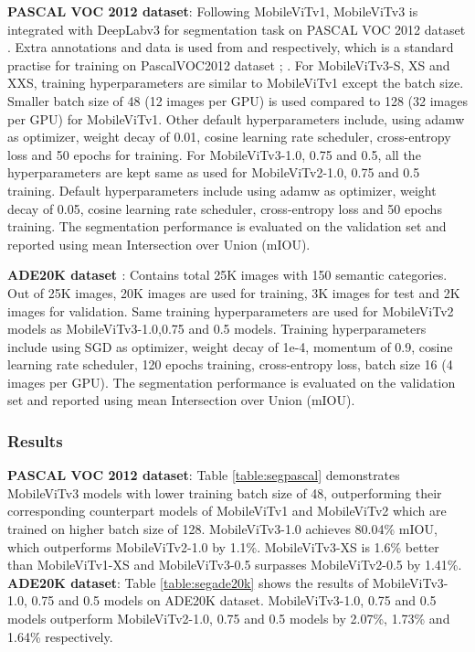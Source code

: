 \documentclass{article} \usepackage{iclr2022_conference,times}
\begin{document}
\textbf{PASCAL VOC 2012 dataset}: 
Following MobileViTv1, MobileViTv3 is integrated with DeepLabv3 \citep{chen2017rethinking} for segmentation task on PASCAL VOC 2012 dataset \citep{Everingham15}.
Extra annotations and data is used from \citep{hariharan2011semantic} and \citep{lin2014microsoft} respectively, which is a standard practise for training on PascalVOC2012 dataset \citep{chen2017rethinking}; \citep{mehta2019espnetv2}.
For MobileViTv3-S, XS and XXS, training hyperparameters are similar to MobileViTv1 except the batch size. 
Smaller batch size of 48 (12 images per GPU) is used compared to 128 (32 images per GPU) for MobileViTv1. 
Other default hyperparameters include, using adamw as optimizer, weight decay of 0.01, cosine learning rate scheduler, cross-entropy loss and 50 epochs for training. 
For MobileViTv3-1.0, 0.75 and 0.5, all the hyperparameters are kept same as used for MobileViTv2-1.0, 0.75 and 0.5 training. 
Default hyperparameters include using adamw as optimizer, weight decay of 0.05, cosine learning rate scheduler, cross-entropy loss and 50 epochs training. 
The segmentation performance is evaluated on the validation set and reported using mean Intersection over Union (mIOU).

\textbf{ADE20K dataset \citep{zhou2019semantic}}: 
Contains total 25K images with 150 semantic categories. 
Out of 25K images, 20K images are used for training, 3K images for test and 2K images for validation. 
Same training hyperparameters are used for MobileViTv2 models as MobileViTv3-1.0,0.75 and 0.5 models. 
Training hyperparameters include using SGD as optimizer, weight decay of 1e-4, momentum of 0.9, cosine learning rate scheduler, 120 epochs training, cross-entropy loss, batch size 16 (4 images per GPU). 
The segmentation performance is evaluated on the validation set and reported using mean Intersection over Union (mIOU).

\subsubsection{Results}

\textbf{PASCAL VOC 2012 dataset}: 
Table \ref{table:segpascal} demonstrates MobileViTv3 models with lower training batch size of 48, outperforming their corresponding counterpart models of MobileViTv1 and MobileViTv2 which are trained on higher batch size of 128.
MobileViTv3-1.0 achieves 80.04\% mIOU, which outperforms MobileViTv2-1.0 by 1.1\%.
MobileViTv3-XS is  1.6\% better than MobileViTv1-XS and MobileViTv3-0.5 surpasses MobileViTv2-0.5 by 1.41\%. 
\textbf{ADE20K dataset}: Table \ref{table:segade20k} shows the results of MobileViTv3-1.0, 0.75 and 0.5 models on ADE20K dataset. 
MobileViTv3-1.0, 0.75 and 0.5 models outperform MobileViTv2-1.0, 0.75 and 0.5 models by 2.07\%, 1.73\% and 1.64\% respectively.
\end{document}
